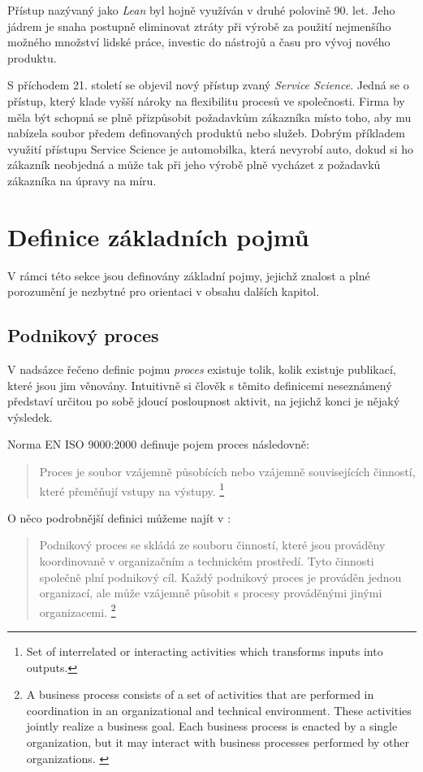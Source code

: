 Přístup nazývaný jako \textit{Lean} byl hojně využíván v druhé polovině 90. let. Jeho jádrem je snaha postupně eliminovat ztráty při výrobě za použití nejmenšího možného množství lidské práce, investic do nástrojů a času pro vývoj nového produktu.

S příchodem 21. století se objevil nový přístup zvaný \textit{Service Science}. Jedná se o přístup, který klade vyšší nároky na flexibilitu procesů ve společnosti. Firma by měla být schopná se plně přizpůsobit požadavkům zákazníka místo toho, aby mu nabízela soubor předem definovaných produktů nebo služeb. Dobrým příkladem využití přístupu Service Science je automobilka, která nevyrobí auto, dokud si ho zákazník neobjedná a může tak při jeho výrobě plně vycházet z požadavků zákazníka na úpravy na míru.

\section{Definice základních pojmů}
V rámci této sekce jsou definovány základní pojmy, jejichž znalost a plné porozumění je nezbytné pro orientaci v obsahu dalších kapitol.

\subsection{Podnikový proces}
V nadsázce řečeno definic pojmu \textit{proces} existuje tolik, kolik existuje publikací, které jsou jim věnovány. Intuitivně si člověk s těmito definicemi neseznámený představí určitou po sobě jdoucí posloupnost aktivit, na jejichž konci je nějaký výsledek.

Norma EN ISO 9000:2000 definuje pojem proces následovně: \cite{iso_9000}

\begin{quote}
Proces je soubor vzájemně působících nebo vzájemně souvisejících činností, které přeměňují vstupy na výstupy.
\footnote{Set of interrelated or interacting activities which transforms inputs into outputs.}
\end{quote}

O něco podrobnější definici můžeme najít v \cite{Weske2007}:

\begin{quote}
Podnikový proces se skládá ze souboru činností, které jsou prováděny koordinovaně v organizačním a technickém prostředí. Tyto činnosti společně plní podnikový cíl. Každý podnikový proces je prováděn jednou organizací, ale může vzájemně působit s procesy prováděnými jinými organizacemi.
\footnote{A business process consists of a set of activities that are performed in coordination in an organizational and technical environment. These activities jointly realize a business goal. Each business process is enacted by a single organization, but it may interact with business processes performed by other organizations. \cite{Weske2007}}
\end{quote}

